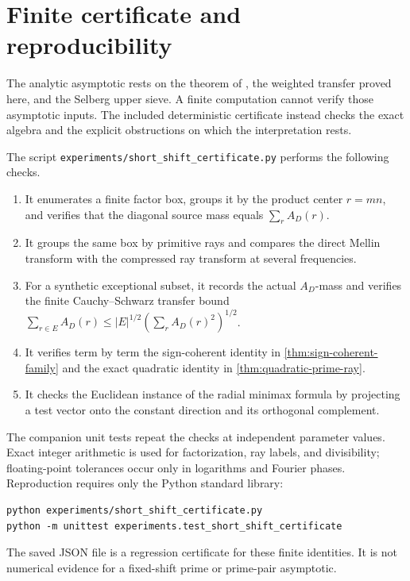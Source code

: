 \section{Finite certificate and reproducibility}
\label{sec:computation}

The analytic asymptotic rests on the theorem of
\citet{GuthMaynard2026}, the weighted transfer proved here, and the
Selberg upper sieve.  A finite computation cannot verify those asymptotic
inputs.  The included deterministic certificate instead checks the exact
algebra and the explicit obstructions on which the interpretation rests.

The script \texttt{experiments/short\_shift\_certificate.py} performs the
following checks.

\begin{enumerate}[label=\textup{(\roman*)}]
 \item It enumerates a finite factor box, groups it by the product center
 $r=mn$, and verifies that the diagonal source mass equals
 $\sum_rA_D(r)$.

 \item It groups the same box by primitive rays and compares the direct
 Mellin transform with the compressed ray transform at several
 frequencies.

 \item For a synthetic exceptional subset, it records the actual
 $A_D$-mass and verifies the finite Cauchy--Schwarz transfer bound
 $\sum_{r\in E}A_D(r)\leq |E|^{1/2}(\sum_rA_D(r)^2)^{1/2}$.

 \item It verifies term by term the sign-coherent identity in
 \cref{thm:sign-coherent-family} and the exact quadratic identity in
 \cref{thm:quadratic-prime-ray}.

 \item It checks the Euclidean instance of the radial minimax formula by
 projecting a test vector onto the constant direction and its orthogonal
 complement.
\end{enumerate}

The companion unit tests repeat the checks at independent parameter
values.  Exact integer arithmetic is used for factorization, ray labels,
and divisibility; floating-point tolerances occur only in logarithms and
Fourier phases.  Reproduction requires only the Python standard library:
\begin{verbatim}
python experiments/short_shift_certificate.py
python -m unittest experiments.test_short_shift_certificate
\end{verbatim}
The saved JSON file is a regression certificate for these finite
identities.  It is not numerical evidence for a fixed-shift prime or
prime-pair asymptotic.

